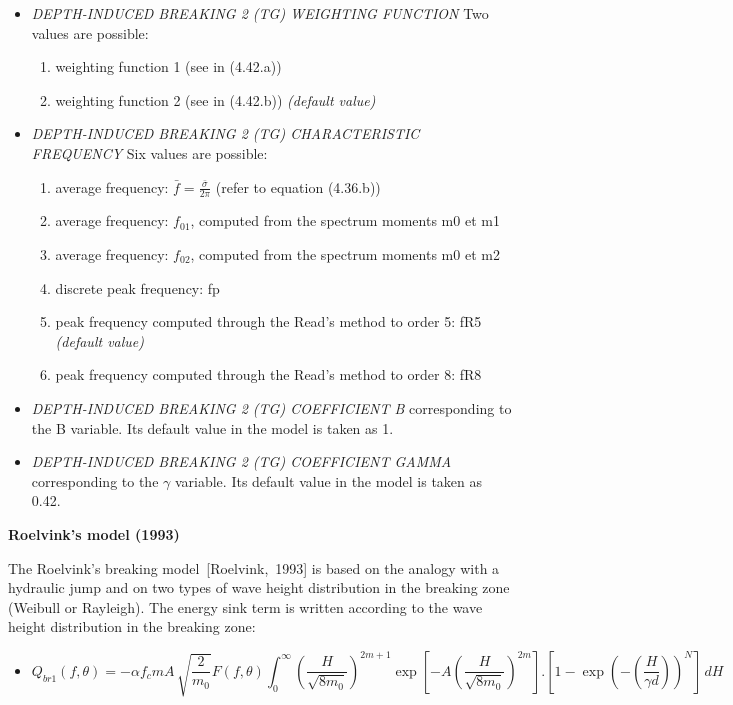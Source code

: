  \begin{itemize}
\item \textit{DEPTH-INDUCED BREAKING 2 (TG) WEIGHTING FUNCTION} Two values are possible:
 \begin{enumerate}
 \item weighting function 1 (see in (4.42.a))
 \item weighting function 2 (see in (4.42.b))\textit{ (default value)}
\end{enumerate}

 \item \textit{DEPTH-INDUCED BREAKING 2 (TG) CHARACTERISTIC FREQUENCY} Six values are possible:
 \begin{enumerate}
 \item average frequency: $\bar{f}=\frac{\bar{\sigma }}{2\pi } $  (refer to equation (4.36.b))
 \item average frequency: $f_{01} $, computed from the spectrum moments m0 et m1
 \item average frequency: $f_{02} $, computed from the spectrum moments m0 et m2
 \item discrete peak frequency: fp
 \item peak frequency computed through the Read's method to order 5: fR5 \textit{(default value)}
 \item peak frequency computed through the Read's method to order 8: fR8
\end{enumerate}

 \item \textit{ DEPTH-INDUCED BREAKING 2 (TG) COEFFICIENT B} corresponding to the B variable. Its default value in the model is taken as 1.

 \item \textit{DEPTH-INDUCED BREAKING 2 (TG) COEFFICIENT GAMMA} corresponding to the $\gamma $ variable. Its default value in the model is taken as 0.42.
\end{itemize}


{\bf  Roelvink's model (1993)}

 The Roelvink's breaking model~[Roelvink,~1993] is based on the analogy with a hydraulic jump and on two types of wave height distribution in the breaking zone (Weibull or Rayleigh). The energy sink term is written according to the wave height distribution in the breaking zone:

\begin{itemize}
\item  {}
\begin{equation} \label{GrindEQ__4_50_}
Q_{br1} \left(f,\theta \right)=-\alpha f_{c} mA\, \sqrt{\frac{2}{m_{0} } } F\left(f,\theta \right)\int _{0}^{\infty }\left(\frac{H}{\sqrt{8m_{0} } } \right)^{2m+1} \exp \left[-A\left(\frac{H}{\sqrt{8m_{0} } } \right)^{2m} \right].\left[1-\exp \left(-\left(\frac{H}{\gamma d} \right)\right)^{N} \right] \, dH
\end{equation}
\end{itemize}

